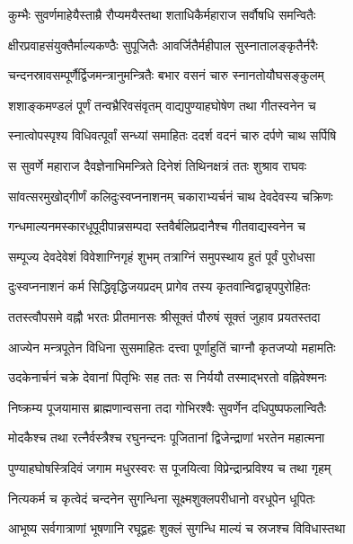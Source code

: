 \twolineshloka
{कुम्भैः सुवर्णमाहेयैस्ताम्रै रौप्यमयैस्तथा}
{शताधिकैर्महाराज सर्वौषधि समन्वितैः}%

\twolineshloka
{क्षीरप्रवाहसंयुक्तैर्माल्यकण्ठैः सुपूजितैः}
{आवर्जितैर्महीपाल सुस्नातालङ्कृतैर्नरैः}%

\twolineshloka
{चन्दनस्रावसम्पूर्णैर्द्विजमन्त्रानुमन्त्रितैः}
{बभार वसनं चारु स्नानतोयौघसङ्कुलम्}%

\twolineshloka
{शशाङ्कमण्डलं पूर्णं तन्वभ्रैरिवसंवृतम्}
{वाद्यपुण्याहघोषेण तथा गीतस्वनेन च} %

\twolineshloka
{स्नात्वोपस्पृश्य विधिवत्पूर्वां सन्ध्यां समाहितः}
{ददर्श वदनं चारु दर्पणे चाथ सर्पिषि}%

\twolineshloka
{स सुवर्णे महाराज दैवज्ञेनाभिमन्त्रिते}
{दिनेशं तिथिनक्षत्रं ततः शुश्राव राघवः}%

\twolineshloka
{सांवत्सरमुखोद्गीर्णं कलिदुःस्वप्ननाशनम्}
{चकाराभ्यर्चनं चाथ देवदेवस्य चक्रिणः}%

\twolineshloka
{गन्धमाल्यनमस्कारधूपूदीपान्नसम्पदा}
{स्तवैर्बलिप्रदानैश्च गीतवाद्यस्वनेन च}%

\twolineshloka
{सम्पूज्य देवदेवेशं विवेशाग्निगृहं शुभम्}
{तत्राग्निं समुपस्थाय हुतं पूर्वं पुरोधसा}%

\twolineshloka
{दुःस्वप्ननाशनं कर्म सिद्धिवृद्धिजयप्रदम्}
{प्रागेव तस्य कृतवान्विद्वान्नृपपुरोहितः}%

\twolineshloka
{ततस्त्वौपसमे वह्नौ भरतः प्रीतमानसः}
{श्रीसूक्तं पौरुषं सूक्तं जुहाव प्रयतस्तदा}%

\twolineshloka
{आज्येन मन्त्रपूतेन विधिना सुसमाहितः}
{दत्त्वा पूर्णाहुतिं चाग्नौ कृतजप्यो महामतिः}%

\twolineshloka
{उदकेनार्चनं चक्रे देवानां पितृभिः सह}
{ततः स निर्ययौ तस्माद्भरतो वह्निवेश्मनः}%

\twolineshloka
{निष्क्रम्य पूजयामास ब्राह्मणान्वसना तदा}
{गोभिरश्वैः सुवर्णेन दधिपुष्पफलान्वितैः} %

\twolineshloka
{मोदकैश्च तथा रत्नैर्वस्त्रैश्च रघुनन्दनः}
{पूजितानां द्विजेन्द्राणां भरतेन महात्मना}%

\twolineshloka
{पुण्याहघोषस्त्रिदिवं जगाम मधुरस्वरः}
{स पूजयित्वा विप्रेन्द्रान्प्रविश्य च तथा गृहम्}%

\twolineshloka
{नित्यकर्म च कृत्वेदं चन्दनेन सुगन्धिना}
{सूक्ष्मशुक्लपरीधानो वरधूपेन धूपितः}%

\twolineshloka
{आभूष्य सर्वगात्राणां भूषणानि रघूद्वहः}
{शुक्लं सुगन्धि माल्यं च स्रजश्च विविधास्तथा}%

